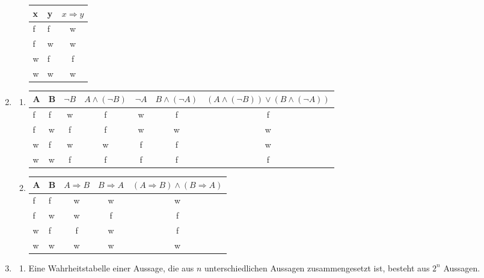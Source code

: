 \documentclass[a4paper]{article}
\begin{document}
\begin{enumerate}
\begin{enumerate}
			\begin{tabular}{|l|l|c|}
				\firsthline
					x & y & $ x \Rightarrow y $ \\
				\hline
					f & f & w \\
					f & w & w \\
					w & f & f \\
					w & w & w \\
				\hline
			\end{tabular}
		\end{enumerate}
		
		\item
		\begin{enumerate}
			\item
			\begin{tabular}{|l|l|c|c|c|c|c|}
				\firsthline
					A & B & $\lnot B$ & $A \land (\lnot B)$ & $\lnot A$ & $B \land (\lnot A)$ & $(A \land (\lnot B)) \lor (B \land (\lnot A))$ \\
				\hline
					f & f & w & f & w & f & f \\
					f & w & f & f & w & w & w \\
					w & f & w & w & f & f & w \\
					w & w & f & f & f & f & f \\
				\hline
			\end{tabular}
			
			\item
			\begin{tabular}{|l|l|c|c|c|}
				\firsthline
				A & B & $A \Rightarrow B$ & $B \Rightarrow A$ & $(A \Rightarrow B) \land (B \Rightarrow A)$ \\
				\hline
				f & f & w & w & w \\
				f & w & w & f & f \\
				w & f & f & w & f \\
				w & w & w & w & w \\
				\hline
			\end{tabular}
		\end{enumerate}
		
		\item
		\begin{enumerate}
			\item Eine Wahrheitstabelle einer Aussage, die aus $n$ unterschiedlichen Aussagen zusammengesetzt ist, besteht aus $2^n$ Aussagen.
			

\end{enumerate}
\end{enumerate}
\end{document}
